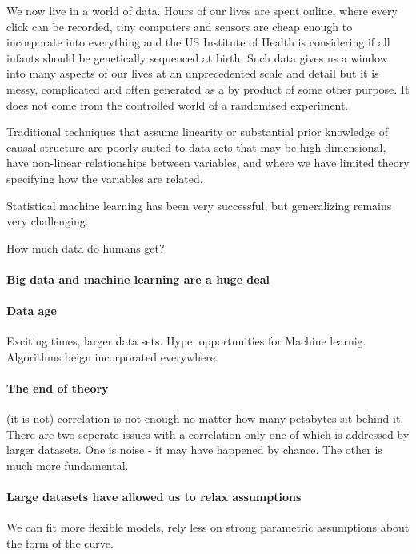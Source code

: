 \documentclass[11pt,a4paper,oneside]{book}
\begin{document}
We now live in a world of data. Hours of our lives are spent online, where every click can be recorded, tiny computers and sensors are cheap enough to incorporate into everything and the US Institute of Health is considering if all infants should be genetically sequenced at birth. Such data gives us a window into many aspects of our lives at an unprecedented scale and detail but it is messy, complicated and often generated as a by product of some other purpose. It does not come from the controlled world of a randomised experiment. 


Traditional techniques that assume linearity or substantial prior knowledge of causal structure are poorly suited to data sets that may be high dimensional, have non-linear relationships between variables, and where we have limited theory specifying how the variables are related.





Statistical machine learning has been very successful, but generalizing remains very challenging. 


How much data do humans get? 



\paragraph*{Big data and machine learning are a huge deal}

\paragraph*{Data age} Exciting times, larger data sets. Hype, opportunities for Machine learnig. Algorithms beign incorporated everywhere. 

\paragraph*{The end of theory} (it is not) correlation is not enough no matter how many petabytes sit behind it. There are two seperate issues with a correlation only one of which is addressed by larger datasets. One is noise - it may have happened by chance. The other is much more fundamental.

\paragraph*{Large datasets have allowed us to relax assumptions} We can fit more flexible models, rely less on strong parametric assumptions about the form of the curve. 
\end{document}
